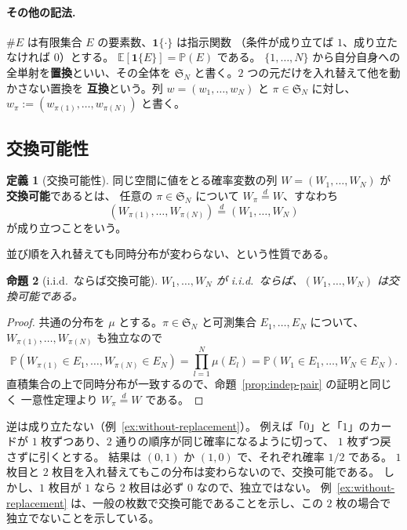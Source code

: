 \documentclass[a4paper,11pt]{jsarticle}
\theoremstyle{definition}
\newtheorem{definition}{定義}[section]
\theoremstyle{plain}
\newtheorem{proposition}[definition]{命題}
\theoremstyle{remark}
\newcommand{\Prob}{\mathbb{P}}
\newcommand{\Exp}{\mathbb{E}}
\newcommand{\Ind}{\mathbf{1}}                  %
\newcommand{\eqd}{\overset{d}{=}}               %
\begin{document}
\paragraph{その他の記法.}
$\#E$ は有限集合 $E$ の要素数、$\Ind\{\cdot\}$ は指示関数
（条件が成り立てば $1$、成り立たなければ $0$）とする。
$\Exp[\Ind\{E\}]=\Prob(E)$ である。
$\{1,\dots,N\}$ から自分自身への全単射を\textbf{置換}といい、その全体を
$\mathfrak{S}_N$ と書く。$2$ つの元だけを入れ替えて他を動かさない置換を
\textbf{互換}という。列 $w=(w_1,\dots,w_N)$ と $\pi\in\mathfrak{S}_N$ に対し、
$w_\pi:=(w_{\pi(1)},\dots,w_{\pi(N)})$ と書く。

\subsection{交換可能性}
\label{sec:exchangeability}

\begin{definition}[交換可能性]
  \label{def:exch}
  同じ空間に値をとる確率変数の列 $W=(W_1,\dots,W_N)$ が\textbf{交換可能}であるとは、
  任意の $\pi\in\mathfrak{S}_N$ について $W_\pi\eqd W$、すなわち
  \begin{equation*}
    (W_{\pi(1)},\dots,W_{\pi(N)})\eqd(W_1,\dots,W_N)
  \end{equation*}
  が成り立つことをいう。
\end{definition}

並び順を入れ替えても同時分布が変わらない、という性質である。

\begin{proposition}[i.i.d.\ ならば交換可能]
  \label{prop:iid-exch}
  $W_1,\dots,W_N$ が i.i.d.\ ならば、$(W_1,\dots,W_N)$ は交換可能である。
\end{proposition}

\begin{proof}
  共通の分布を $\mu$ とする。$\pi\in\mathfrak{S}_N$ と可測集合 $E_1,\dots,E_N$ について、
  $W_{\pi(1)},\dots,W_{\pi(N)}$ も独立なので
  \begin{equation*}
    \Prob(W_{\pi(1)}\in E_1,\dots,W_{\pi(N)}\in E_N)
    =\prod_{l=1}^{N}\mu(E_l)
    =\Prob(W_1\in E_1,\dots,W_N\in E_N).
  \end{equation*}
  直積集合の上で同時分布が一致するので、命題~\ref{prop:indep-pair} の証明と同じく
  一意性定理より $W_\pi\eqd W$ である。
\end{proof}

逆は成り立たない（例~\ref{ex:without-replacement}）。
例えば「$0$」と「$1$」のカードが $1$ 枚ずつあり、$2$ 通りの順序が同じ確率になるように切って、
$1$ 枚ずつ戻さずに引くとする。
結果は $(0,1)$ か $(1,0)$ で、それぞれ確率 $1/2$ である。
$1$ 枚目と $2$ 枚目を入れ替えてもこの分布は変わらないので、交換可能である。
しかし、$1$ 枚目が $1$ なら $2$ 枚目は必ず $0$ なので、独立ではない。
例~\ref{ex:without-replacement} は、一般の枚数で交換可能であることを示し、この $2$ 枚の場合で
独立でないことを示している。
\end{document}
